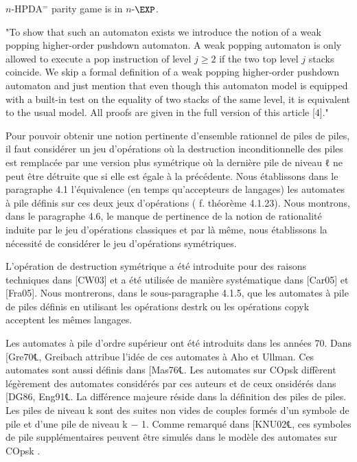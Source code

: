 \begin{theorem}\label{HPDA parity game}
{\sc $n$-HPDA$^=$ parity game} is in $n$-$\EXP$.
\end{theorem}





\iffalse
"To show that such an automaton exists we introduce the notion of a weak
popping higher-order pushdown automaton. A weak popping automaton is only
allowed to execute a pop instruction of level $j \geq 2$ if the two top level $j$ stacks
coincide. We skip a formal definition of a weak popping higher-order pushdown
automaton and just mention that even though this automaton model is equipped
with a built-in test on the equality of two stacks of the same level, it is equivalent
to the usual model. All proofs are given in the full version of this article [4]."

Pour pouvoir obtenir une notion pertinente d'ensemble rationnel de piles de
piles, il faut considérer un jeu d'opérations où la destruction inconditionnelle des
piles est remplacée par une version plus symétrique où la dernière pile de niveau ℓ
ne peut être détruite que si elle est égale à la précédente. Nous établissons dans le
paragraphe 4.1 l'équivalence (en temps qu'accepteurs de langages) les automates
à pile définis sur ces deux jeux d'opérations ( f. théorème 4.1.23). Nous montrons,
dans le paragraphe 4.6, le manque de pertinence de la notion de rationalité induite
par le jeu d'opérations classiques et par là même, nous établissons la nécessité de
considérer le jeu d'opérations symétriques.

L'opération de destruction symétrique a été introduite pour des raisons techniques dans 
[CW03] et a été utilisée de manière 
systématique dans [Car05] et
[Fra05]. 
Nous montrerons, dans le sous-paragraphe 4.1.5, que les automates à pile
de piles définis en utilisant les opérations destrk ou les opérations copyk acceptent
les mêmes langages.

Les automates à pile d'ordre supérieur ont été introduits dans les années 70.
Dans [Gre70℄, Greibach attribue l'idée de ces automates à Aho et Ullman. Ces
automates sont aussi définis dans [Mas76℄. Les automates sur COpsk diffèrent
légèrement des automates considérés par ces auteurs et de ceux onsidérés dans
[DG86, Eng91℄. La différence majeure réside dans la définition des piles de piles.
Les piles de niveau k sont des suites non vides de couples formés d'un symbole de
pile et d'une pile de niveau k − 1. Comme remarqué dans [KNU02℄, ces symboles
de pile supplémentaires peuvent être simulés dans le modèle des automates sur
COpsk .

